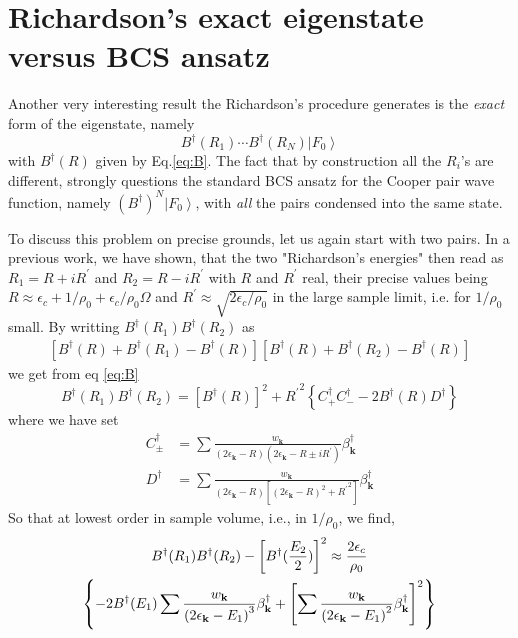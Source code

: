\documentclass[aps,prb,superscriptaddress,twocolumn]{revtex4}
\newcommand{\vk}{\ensuremath{\mathbf{k}}}
\begin{document}
\section{Richardson's exact eigenstate versus BCS ansatz \label{sec:conn}}

Another very interesting result the Richardson's procedure generates is the 
\emph{exact} form of the eigenstate, namely 
\begin{equation}
B^{\dagger}(R_1)\cdots{}B^{\dagger}(R_N)\left|F_0\right>  
\end{equation}
with $B^{\dagger}(R)$ given by Eq.\eqref{eq:B}. The fact that by
construction all the $R_i$'s are different, strongly questions the standard
BCS ansatz for the Cooper pair wave function, namely $\left(B^{\dagger}\right)
^N\left|F_0\right> $, with \emph{all} the pairs condensed into the same
state.

To discuss this problem on precise grounds, let us again start with two pairs. In
a previous work\cite{combescotBCS}, we have shown, that the two "Richardson's
energies" then read as $R_1=R+iR^{\prime}$ and $R_2=R-i{}R^{\prime}$ with $R$
and $R^{\prime}$ real, their precise values being $R\approx\epsilon_c+1/%
\rho_0+\epsilon_c/\rho_0\Omega$ and $R^{\prime}\approx\sqrt{2\epsilon_c/\rho_0}$ in the
large sample limit, i.e. for $1/\rho_0$ small. By writting $B^{\dagger}(R_1)B^{\dagger}(R_2)$ as 
\begin{multline}
\left[B^{\dagger}(R)+B^{\dagger}(R_1)-B^{\dagger}(R)\right] \left[%
B^{\dagger}(R)+B^{\dagger}(R_2)-B^{\dagger}(R)\right] 
\end{multline}
we get from eq \eqref{eq:B} 
\begin{equation}
B^{\dagger}(R_1)B^{\dagger}(R_2)=\left[B^{\dagger}(R)\right]
^2+{R^{\prime}}^2\left\{C^{\dagger}_+C^{\dagger}_--2B^{\dagger}(R)D^{\dagger}%
\right\} 
\end{equation}
where we have set 
\begin{align}
C^{\dagger}_{\pm}&=\sum\frac{w_\vk}{\left(2\epsilon_\vk-R\right)
\left(2\epsilon_\vk-R\pm{}iR^{\prime}\right) }\beta^{\dagger}_\vk \\
D^{\dagger}&=\sum\frac{w_\vk}{\left(2\epsilon_\vk-R\right) \left[%
\left(2\epsilon_\vk-R\right) ^2+{}{R^{\prime}}^2\right] }\beta^{\dagger}_\vk
\end{align}
So that at lowest order in sample volume, i.e., in $1/\rho_0$, we find, 
\begin{multline}  \label{eq:BB}
B^{\dagger}(R_1)B^{\dagger}(R_2)-\left[B^{\dagger}(\frac{E _2}{2})%
\right] ^2\approx \frac{2\epsilon_c}{\rho_0} \\
\left\{-2B^{\dagger}(E _1)\sum\frac{w_\vk}{\left(2\epsilon_\vk-%
E _1\right) ^3}\beta^{\dagger}_\vk +\left[\sum\frac{w_\vk}{%
\left(2\epsilon_\vk-E _1\right) ^2}\beta^{\dagger}_\vk\right]
^2\right\}  
\end{multline}
\end{document}
